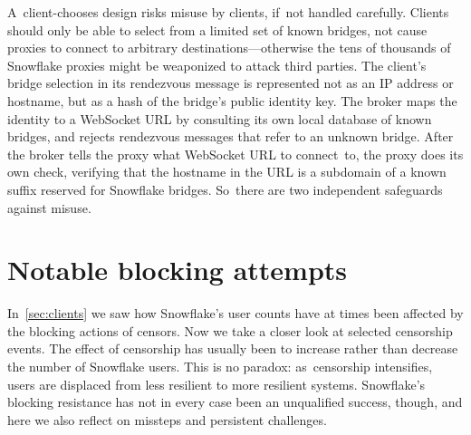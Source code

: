 \documentclass[letterpaper,twocolumn]{article}
\begin{document}
A~client-chooses design risks
misuse by clients, if~not handled carefully.
Clients should only be able to select from
a limited set of known bridges,
not cause proxies to connect to arbitrary destinations---otherwise
the tens of thousands of Snowflake proxies might be weaponized
to attack third parties.
The client's bridge selection
in its rendezvous message is represented
not as an IP address or hostname,
but as a hash of the bridge's public identity key.
The broker maps the identity to a WebSocket URL
by consulting its own local database of known bridges,
and rejects rendezvous messages that refer to an unknown bridge.
After the broker tells the proxy what WebSocket URL to connect~to,
the proxy does its own check,
verifying that the hostname in the URL is a subdomain of
a known suffix reserved for Snowflake bridges.
So~there are two independent safeguards against misuse.


\section{Notable blocking attempts}
\label{sec:block}

In~\autoref{sec:clients} we saw how Snowflake's user counts
have at times been affected by the blocking actions of censors.
Now we take a closer look at selected censorship events.
The effect of censorship has usually been to increase rather than decrease
the number of Snowflake users.
This is no paradox:
as~censorship intensifies,
users are displaced from less resilient
to more resilient systems.
Snowflake's blocking resistance has not in every case been an unqualified success,
though, and here we also reflect on missteps
and persistent challenges.
\end{document}
